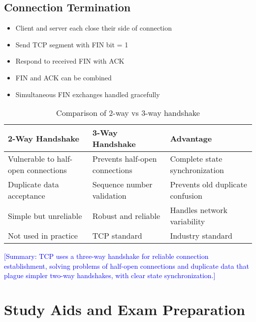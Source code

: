 \documentclass[12pt]{article}
\begin{document}
\subsection{Connection Termination}
\begin{itemize}
    \item Client and server each close their side of connection
    \item Send TCP segment with FIN bit = 1
    \item Respond to received FIN with ACK
    \item FIN and ACK can be combined
    \item Simultaneous FIN exchanges handled gracefully
\end{itemize}

\begin{table}[h]
    \centering
    \begin{tabular}{p{}p{}p{}}
        \toprule
        \textbf{2-Way Handshake}            & \textbf{3-Way Handshake}       & \textbf{Advantage}               \\
        \midrule
        Vulnerable to half-open connections & Prevents half-open connections & Complete state synchronization   \\
        Duplicate data acceptance           & Sequence number validation     & Prevents old duplicate confusion \\
        Simple but unreliable               & Robust and reliable            & Handles network variability      \\
        Not used in practice                & TCP standard                   & Industry standard                \\
        \bottomrule
    \end{tabular}
    \caption{Comparison of 2-way vs 3-way handshake}
    \label{tab:handshake_comparison}
\end{table}

\textcolor{blue}{[Summary: TCP uses a three-way handshake for reliable connection establishment, solving problems of half-open connections and duplicate data that plague simpler two-way handshakes, with clear state synchronization.]}

\section{Study Aids and Exam Preparation}
\end{document}
